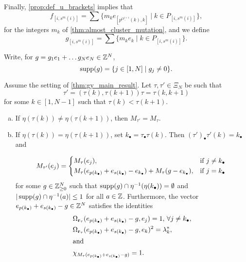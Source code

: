 Finally, \cref{prop:def_u_brackets} implies that
\begin{equation*}
	f_{[i, s^m(i)]} = \sum\{m_k e_{[p^{O^{i+1}_{-}}(k), k]} \mid k \in P_{[i, s^m(i)]}\},
\end{equation*}
for the integers $m_k$ of \cref{thm:almost_cluster_mutation}, and we define
\begin{equation*}
	g_{[i, s^m(i)]} = \sum\{m_k e_k \mid k \in P_{[i, s^m(i)]}\}.
\end{equation*}

Write, for $g = g_1e_1 + \dots g_N e_N \in \mathbb{Z}^N$,
\begin{equation*}
	\operatorname{supp}(g) = \{j \in [1, N] \mid g_j \neq 0\}.
\end{equation*}

\begin{proposition}\label{prop:mutation_adjacent_permutations}
	Assume the setting of \cref{thm:gy_main_result}. Let $\tau, \tau' \in \Xi_N$ be such that
	\begin{equation*}
		\tau' = (\tau(k), \tau(k+1))\tau = \tau(k, k+1)
	\end{equation*}
	for some $k \in [1, N-1]$ such that $\tau(k) < \tau(k+1)$.
	\begin{enumerate}[(a)]
		\item If $\eta(\tau(k)) \neq \eta(\tau(k + 1))$, then $M_{\tau'} = M_\tau$.
		\item If $\eta(\tau(k)) = \eta(\tau(k+1))$, set $k_\bullet = \tau_\bullet\tau(k)$. Then
		      $(\tau')_\bullet\tau'(k) = k_\bullet$ and

		      \begin{equation*}
			      M_{\tau'}(e_j) = \begin{dcases*}
				      M_{\tau}(e_j),                                                                         & if $j \neq k_\bullet$ \\
				      M_\tau(e_{p(k_\bullet)} + e_{s(k_\bullet)} - e_{k_\bullet}) + M_\tau(g-e_{k_\bullet}), & if $j =k_\bullet$
			      \end{dcases*}
		      \end{equation*}
		      for some $g \in \mathbb{Z}^N_{\geq 0}$ such that $\operatorname{supp}(g)\cap \eta^{-1}(\eta(k_\bullet)) = \emptyset$ and $|\operatorname{supp}(g)\cap \eta ^{-1} (a)| \leq 1$ for all $a \in \mathbb{Z}$. Furthermore, the vector $e_{p(k_\bullet)} + e_{s(k_\bullet)} - g \in \mathbb{Z}^N$ satisfies the identities
		      \begin{align*}
			       & \Omega_{\mathbf{r}_\tau}(e_{p(k_\bullet)} + e_{s(k_\bullet)} - g, e_j) = 1, \, \forall j \neq k_\bullet, \\
			       & \Omega_{\mathbf{r}_\tau}(e_{p(k_\bullet)} + e_{s(k_\bullet)} - g, e_k)^2 = \lambda^*_k,                  \\
			      \shortintertext{and}
			       & \chi_{M_\tau(e_{p(k_\bullet)} + e_{s(k_\bullet)} - g)} = 1.
		      \end{align*}
	\end{enumerate}
\end{proposition}
